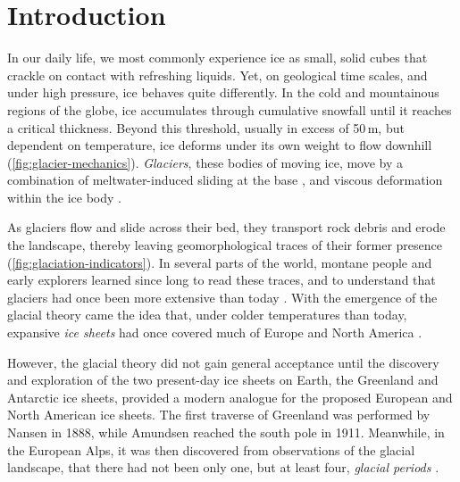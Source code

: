 \documentclass{article}
\begin{document}
\newpage
\tableofcontents
\newpage

\section{Introduction}

In our daily life, we most commonly experience ice as small, solid cubes
that crackle on contact with refreshing liquids. Yet, on geological
time scales, and under high pressure, ice behaves quite differently.
In the cold and mountainous regions of the globe, ice accumulates through
cumulative snowfall until it reaches a critical thickness. Beyond this
threshold, usually in excess of 50\,m, but dependent on temperature, ice
deforms under its own weight to flow downhill (\cref{fig:glacier-mechanics}).
\emph{Glaciers}, these bodies of moving ice, move by a combination of
meltwater-induced sliding at the base \citep[\S532]{Saussure.1786},
and viscous deformation within the
ice body \citep{Forbes.1846b}.

As glaciers flow and slide across their bed, they transport
rock debris and erode the landscape, thereby leaving geomorphological traces of
their former presence (\cref{fig:glaciation-indicators}). In several parts of
the world, montane people
and early explorers learned since long to read these traces, and to
understand that glaciers had once been more extensive than today
\citep[e.g.,][p.~21]{Windham.Martel.1744}. With the emergence of the glacial
theory came the idea that, under colder temperatures
than today, expansive \emph{ice sheets} had once covered much of Europe and
North America \citep{Agassiz.1840}.

However, the glacial theory did not gain general acceptance until the
discovery and exploration
of the two present-day ice sheets on Earth, the Greenland and
Antarctic ice sheets, provided a modern analogue for the proposed European and
North American ice sheets. The first traverse of Greenland was performed by
Nansen in 1888, while Amundsen reached the south pole in 1911. Meanwhile, in
the European Alps, it was then discovered from observations of the glacial
landscape, that there had not been only one, but at least four, \emph{glacial
periods} \citep{Penck.Bruckner.1909}.
\end{document}
